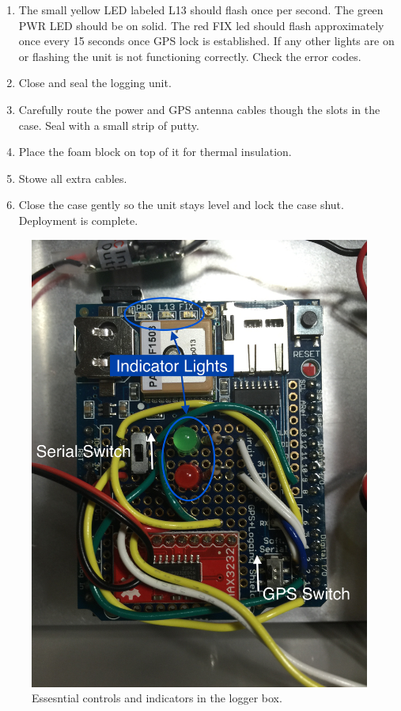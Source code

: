 \documentclass[11pt]{article} %
\begin{document}
\begin{enumerate}
\item The small yellow LED labeled L13 should flash once per second. The green PWR LED should be on solid. The red FIX led should flash approximately once every 15 seconds once GPS lock is established. If any other lights are on or flashing the unit is not functioning correctly. Check the error codes.
\item Close and seal the logging unit.
\item Carefully route the power and GPS antenna cables though the slots in the case. Seal with a small strip of putty.
\item Place the foam block on top of it for thermal insulation.
\item Stowe all extra cables.
\item Close the case gently so the unit stays level and lock the case shut. Deployment is complete.
\end{enumerate}

\begin{figure}
	\centering
		\includegraphics[scale=0.1]{board.jpg}
   	\caption{Essesntial controls and indicators in the logger box.}
  	\label{labeled_box}
\end{figure}
\end{document}
